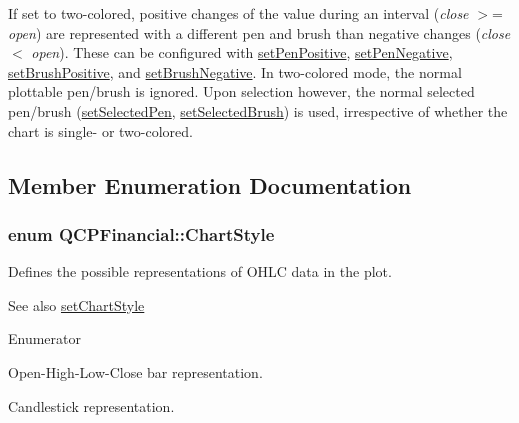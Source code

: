 If set to two-\/colored, positive changes of the value during an interval ({\itshape close} $>$= {\itshape open}) are represented with a different pen and brush than negative changes ({\itshape close} $<$ {\itshape open}). These can be configured with \hyperlink{classQCPFinancial_ac58aa3adc7a35aab0088764b840683e5}{set\+Pen\+Positive}, \hyperlink{classQCPFinancial_afe5c07e94ccea01a75b3a2476993c346}{set\+Pen\+Negative}, \hyperlink{classQCPFinancial_a5ebff2b1764efd07cc44942e67821829}{set\+Brush\+Positive}, and \hyperlink{classQCPFinancial_a8bbdd87629f9144b3ef51af660c0961a}{set\+Brush\+Negative}. In two-\/colored mode, the normal plottable pen/brush is ignored. Upon selection however, the normal selected pen/brush (\hyperlink{classQCPAbstractPlottable_a6911603cad23ab0469b108224517516f}{set\+Selected\+Pen}, \hyperlink{classQCPAbstractPlottable_ae8c816874089f7a44001e8618e81a9dc}{set\+Selected\+Brush}) is used, irrespective of whether the chart is single-\/ or two-\/colored. 

\subsection{Member Enumeration Documentation}
\hypertarget{classQCPFinancial_a0f800e21ee98d646dfc6f8f89d10ebfb}{}
\subsubsection[{Chart\+Style}]{\setlength{\rightskip}{0pt plus 5cm}enum {\bf Q\+C\+P\+Financial\+::\+Chart\+Style}}\label{classQCPFinancial_a0f800e21ee98d646dfc6f8f89d10ebfb}
Defines the possible representations of O\+H\+L\+C data in the plot.

\begin{DoxySeeAlso}{See also}
\hyperlink{classQCPFinancial_a5a59175d36279d71596e64d7bb65596f}{set\+Chart\+Style} 
\end{DoxySeeAlso}
\begin{Desc}
\item[Enumerator]\par
\begin{description}
\item[{\em 
\hypertarget{classQCPFinancial_a0f800e21ee98d646dfc6f8f89d10ebfba3a516016c9298d3e95dd82aa203c4390}{}cs\+Ohlc\label{classQCPFinancial_a0f800e21ee98d646dfc6f8f89d10ebfba3a516016c9298d3e95dd82aa203c4390}
}]Open-\/\+High-\/\+Low-\/\+Close bar representation. \item[{\em 
\hypertarget{classQCPFinancial_a0f800e21ee98d646dfc6f8f89d10ebfbac803cbd39f26e3f206bcc7028679e62f}{}cs\+Candlestick\label{classQCPFinancial_a0f800e21ee98d646dfc6f8f89d10ebfbac803cbd39f26e3f206bcc7028679e62f}
}]Candlestick representation. \end{description}
\end{Desc}


